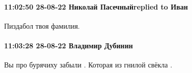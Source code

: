  
 
 
 
 

\paragraph{11:02:50 28-08-22 Николай Пасечныйreplied to Иван}
Пиздабол твоя фамилия.

\paragraph{11:03:28 28-08-22 Владимир Дубинин}
Вы про бурячиху забыли . Которая из гнилой свёкла .
